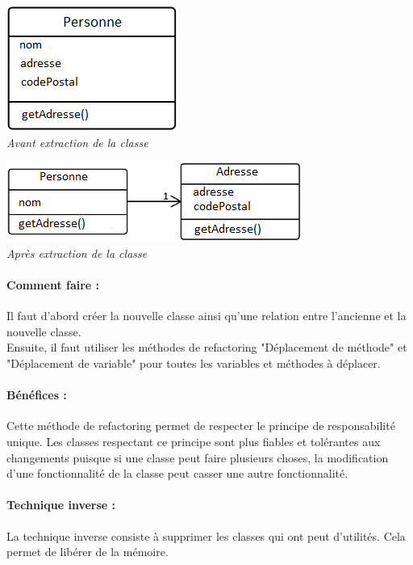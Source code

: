 \documentclass[a4paper,twoside,12pt,openright]{report}
\begin{document}
\begin{center}
\includegraphics[scale=1]{Image/Extraction_Classe.png}\\
\itshape{Avant extraction de la classe}
\end{center}

\begin{center}
\includegraphics[scale=1]{Image/Extraction_Classe2.png}\\
\itshape{Après extraction de la classe}
\end{center}

\paragraph{Comment faire :}
Il faut d'abord créer la nouvelle classe ainsi qu'une relation entre l'ancienne et la nouvelle classe.\\
Ensuite, il faut utiliser les méthodes de refactoring "Déplacement de méthode" et "Déplacement de variable" pour toutes les variables et méthodes à déplacer.

\paragraph{Bénéfices :}
Cette méthode de refactoring permet de respecter le principe de responsabilité unique.
Les classes respectant ce principe sont plus fiables et tolérantes aux changements puisque si une classe peut faire plusieurs choses, la modification d'une fonctionnalité de la classe peut casser une autre fonctionnalité.

\paragraph{Technique inverse :}
La technique inverse consiste à supprimer les classes qui ont peut d'utilités. Cela permet de libérer de la mémoire.\\
\end{document}
